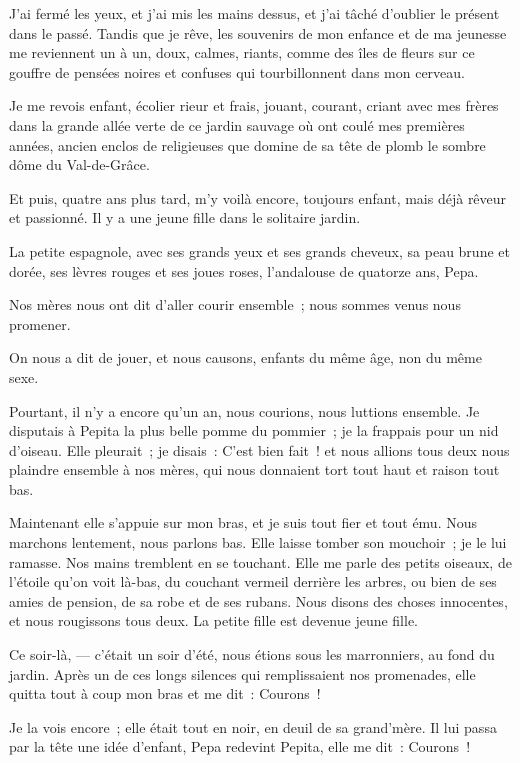 \documentclass[french,twoside]{book} %
\begin{document}
\noindent J’ai fermé les yeux, et j’ai mis les mains dessus, et j’ai tâché d’oublier le présent dans le passé. Tandis que je rêve, les souvenirs de mon enfance et de ma jeunesse me reviennent un à un, doux, calmes, riants, comme des îles de fleurs sur ce gouffre de pensées noires et confuses qui tourbillonnent dans mon cerveau.\par
Je me revois enfant, écolier rieur et frais, jouant, courant, criant avec mes frères dans la grande allée verte de ce jardin sauvage où ont coulé mes premières années, ancien enclos de religieuses que domine de sa tête de plomb le sombre dôme du Val-de-Grâce.\par
Et puis, quatre ans plus tard, m’y voilà encore, toujours enfant, mais déjà rêveur et passionné. Il y a une jeune fille dans le solitaire jardin.\par
La petite espagnole, avec ses grands yeux et ses grands cheveux, sa peau brune et dorée, ses lèvres  rouges et ses joues roses, l’andalouse de quatorze ans, Pepa.\par
Nos mères nous ont dit d’aller courir ensemble ; nous sommes venus nous promener.\par
On nous a dit de jouer, et nous causons, enfants du même âge, non du même sexe.\par
Pourtant, il n’y a encore qu’un an, nous courions, nous luttions ensemble. Je disputais à Pepita la plus belle pomme du pommier ; je la frappais pour un nid d’oiseau. Elle pleurait ; je disais : C’est bien fait ! et nous allions tous deux nous plaindre ensemble à nos mères, qui nous donnaient tort tout haut et raison tout bas.\par
Maintenant elle s’appuie sur mon bras, et je suis tout fier et tout ému. Nous marchons lentement, nous parlons bas. Elle laisse tomber son mouchoir ; je le lui ramasse. Nos mains tremblent en se touchant. Elle me parle des petits oiseaux, de l’étoile qu’on voit là-bas, du couchant vermeil derrière les arbres, ou bien de ses amies de pension, de sa robe et de ses rubans. Nous disons des choses innocentes, et nous rougissons tous deux. La petite fille est devenue jeune fille.\par
Ce soir-là, — c’était un soir d’été, nous étions sous les marronniers, au fond du jardin. Après un de ces longs silences qui remplissaient nos promenades, elle quitta tout à coup mon bras et me dit : Courons !\par
 Je la vois encore ; elle était tout en noir, en deuil de sa grand’mère. Il lui passa par la tête une idée d’enfant, Pepa redevint Pepita, elle me dit : Courons !\par
\end{document}
